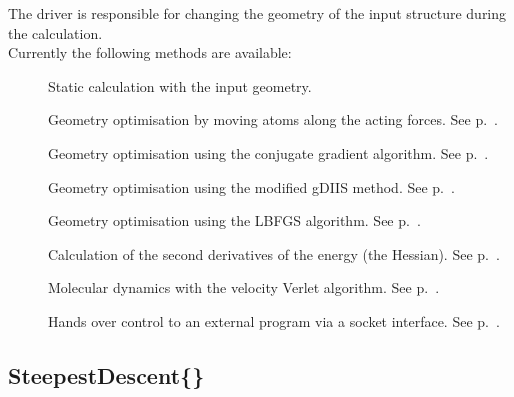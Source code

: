 The driver is responsible for changing the geometry of the input
structure during the calculation.\\ \bigskip Currently the following
methods are available:
\begin{description}
\item[\iscb{}] Static calculation with the input geometry.
\item[] Geometry optimisation by moving atoms
  along the acting forces. See p.~.
\item[] Geometry optimisation using the
  conjugate gradient algorithm. See p.~.
\item[] Geometry optimisation using the modified gDIIS
  method. See p.~.
\item[] Geometry optimisation using the LBFGS
  algorithm. See p.~.
\item[] Calculation of the second derivatives of the
  energy (the Hessian). See p.~.
\item[] Molecular dynamics with the velocity
  Verlet algorithm. See p.~.
\item[] Hands over control to an external program via a socket
  interface. See p.~.
\end{description}


\subsection{SteepestDescent\{\}}
\label{sec:dftbp.SteepestDescent}

